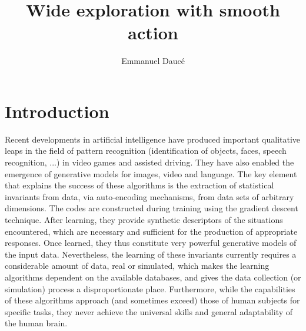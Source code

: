 \documentclass[runningheads]{llncs}
\begin{document}
%
\title{Wide exploration with smooth action}
%
%
\author{Emmanuel Daucé}
%
%
%
\maketitle              %
%
\begin{abstract}

\end{abstract}
%
%
%
\section{Introduction}

Recent developments in artificial intelligence have produced important qualitative leaps in the field of pattern recognition (identification of objects, faces, speech recognition, ...) in video games and assisted driving. 
They have also enabled the emergence of generative models for images, video and language. The key element that explains the success of these algorithms is the extraction of statistical invariants from data, via auto-encoding mechanisms, from data sets of arbitrary dimensions. The codes are constructed during training using the gradient descent technique. After learning, they provide synthetic descriptors of the situations encountered, which are necessary and sufficient for the production of appropriate responses.  Once learned, they thus constitute very powerful generative models of the input data. Nevertheless, the learning of these invariants currently requires a considerable amount of data, real or simulated, which makes the learning algorithms dependent on the available databases, and gives the data collection (or simulation) process a disproportionate place. Furthermore, while the capabilities of these algorithms approach (and sometimes exceed) those of human subjects for specific tasks, they never achieve the universal skills and general adaptability of the human brain. 
\end{document}
